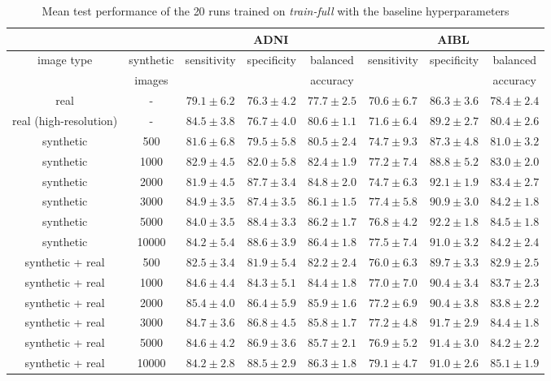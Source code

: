 \documentclass[10pt,journal,compsoc]{IEEEtran}
\begin{document}
\begin{table*}[ht]
 \caption{Mean test performance of the 20 runs trained on \textit{train-full} with the baseline hyperparameters}
 \label{table: app train-full_Conv5FC3}
\centering
\scriptsize
  \begin{tabular}{|c|c||c|c|c||c|c|c|}
    \cline{3-8}
    \multicolumn{2}{c|}{} & \multicolumn{3}{c||}{ADNI} & \multicolumn{3}{c|}{AIBL} \\
    \hline
    \multirow{2}{*}{image type} & synthetic & \multirow{2}{*}{sensitivity} & \multirow{2}{*}{specificity} & balanced & \multirow{2}{*}{sensitivity} & \multirow{2}{*}{specificity} & balanced\\
    & images & & & accuracy & & & accuracy\\
    \hline
    \hline
    real & - & $79.1\pm6.2$ & $76.3\pm4.2$ & $77.7\pm2.5$ & $70.6\pm6.7$ & $86.3\pm3.6$ & $78.4\pm2.4$ \\
    real (high-resolution) & - & $84.5\pm3.8$ & $76.7\pm4.0$ & $80.6\pm1.1$ & $71.6\pm6.4$ & $89.2\pm2.7$ & $80.4\pm2.6$ \\
    \hline
    synthetic & 500 & $81.6\pm6.8$ & $79.5\pm5.8$ & $80.5\pm2.4$ & $74.7\pm9.3$ & $87.3\pm4.8$ & $81.0\pm3.2$ \\
    synthetic & 1000 & $82.9\pm4.5$ & $82.0\pm5.8$ & $82.4\pm1.9$ & $77.2\pm7.4$ & $88.8\pm5.2$ & $83.0\pm2.0$ \\
    synthetic & 2000 & $81.9\pm4.5$ & $87.7\pm3.4$ & $84.8\pm2.0$ & $74.7\pm6.3$ & $92.1\pm1.9$ & $83.4\pm2.7$ \\
    synthetic & 3000 & $\boldsymbol{84.9\pm3.5}$ & $87.4\pm3.5$ & $86.1\pm1.5$ & $77.4\pm5.8$ & $90.9\pm3.0$ & $84.2\pm1.8$ \\
    synthetic & 5000 & $84.0\pm3.5$ & $88.4\pm3.3$ & $86.2\pm1.7$ & $76.8\pm4.2$ & $\boldsymbol{92.2\pm1.8}$ & $\boldsymbol{84.5\pm1.8}$ \\
    synthetic & 10000 & $84.2\pm5.4$ & $\boldsymbol{88.6\pm3.9}$ & $\boldsymbol{86.4\pm1.8}$ & $\boldsymbol{77.5\pm7.4}$ & $91.0\pm3.2$ & $84.2\pm2.4$ \\
    \hline
    synthetic + real & 500 & $82.5\pm3.4$ & $81.9\pm5.4$ & $82.2\pm2.4$ & $76.0\pm6.3$ & $89.7\pm3.3$ & $82.9\pm2.5$ \\
    synthetic + real & 1000 & $84.6\pm4.4$ & $84.3\pm5.1$ & $84.4\pm1.8$ & $77.0\pm7.0$ & $90.4\pm3.4$ & $83.7\pm2.3$ \\
    synthetic + real & 2000 & $\boldsymbol{85.4\pm4.0}$ & $86.4\pm5.9$ & $85.9\pm1.6$ & $77.2\pm6.9$ & $90.4\pm3.8$ & $83.8\pm2.2$ \\
    synthetic + real & 3000 & $84.7\pm3.6$ & $86.8\pm4.5$ & $85.8\pm1.7$ & $77.2\pm4.8$ & $\boldsymbol{91.7\pm2.9}$ & $84.4\pm1.8$ \\
    synthetic + real & 5000 & $84.6\pm4.2$ & $86.9\pm3.6$ & $85.7\pm2.1$ & $76.9\pm5.2$ & $91.4\pm3.0$ & $84.2\pm2.2$ \\
    synthetic + real & 10000 & $84.2\pm2.8$ & $\boldsymbol{88.5\pm2.9}$ & $\boldsymbol{86.3\pm1.8}$ & $\boldsymbol{79.1\pm4.7}$ & $91.0\pm2.6$ & $\boldsymbol{85.1\pm1.9}$ \\
    \hline
  \end{tabular}
\end{table*}
\end{document}
